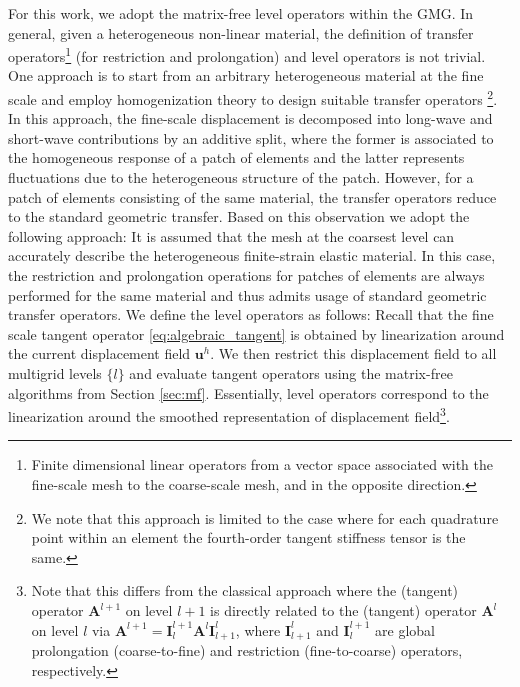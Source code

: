 \documentclass[times,doublespace]{nmeauth}
\newcommand*{\gz}[1]{\boldsymbol{#1}}
\begin{document}
For this work, we adopt the matrix-free level operators within the GMG.
In general, given a heterogeneous non-linear material, the definition of transfer operators\footnote{Finite dimensional linear operators from a vector space associated with the fine-scale mesh to the coarse-scale mesh, and in the opposite direction.} (for restriction and prolongation) and level operators is not trivial. One approach is to start from an arbitrary heterogeneous material at the fine scale and employ homogenization theory \cite{Suquet1987, Hill1972,Hashin1983,Castaneda1997} to design suitable transfer operators \cite{Miehe2007}\footnote{
  We note that this approach is limited to the case where for each quadrature point within an element the fourth-order tangent stiffness tensor is the same.
}.
In this approach, the fine-scale displacement is decomposed into long-wave and short-wave contributions by an additive split, where the former is associated to the homogeneous response of a patch of elements and the latter represents fluctuations due to the heterogeneous structure of the patch.
However, for a patch of elements consisting of the same material, the transfer operators reduce to the standard geometric transfer.
Based on this observation we adopt the following approach: It is assumed that the mesh at the coarsest level can accurately describe the heterogeneous finite-strain elastic material.
In this case, the restriction and prolongation operations for patches of elements are always performed for the same material and thus admits usage of standard geometric transfer operators.
We define the level operators as follows: Recall that the fine scale tangent operator \eqref{eq:algebraic_tangent} is obtained by linearization around the current displacement field $\gz u^h$. We then restrict this displacement field to all multigrid levels $\{l\}$ and evaluate tangent operators using the matrix-free algorithms from Section \ref{sec:mf}.
Essentially, level operators correspond to the linearization around the smoothed representation of displacement field\footnote{
Note that this differs from the classical approach where the (tangent) operator $\gz A^{l+1}$ on level $l+1$ is directly related to the (tangent) operator $\gz A^{l}$ on level $l$ via $\gz A^{l+1}=\gz I^{l+1}_{l} \gz A^l \gz I^l_{l+1}$, where $\gz I^l_{l+1}$ and $\gz I^{l+1}_l$ are global prolongation (coarse-to-fine) and restriction (fine-to-coarse) operators, respectively.
}.
\end{document}
